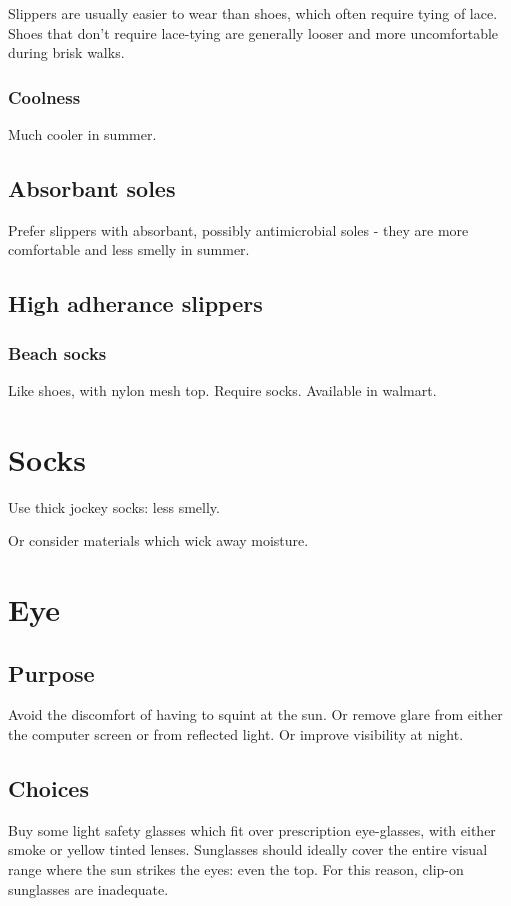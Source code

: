 \documentclass[oneside, article]{memoir}
\begin{document}
Slippers are usually easier to wear than shoes, which often require tying of lace. Shoes that don't require lace-tying are generally looser and more uncomfortable during brisk walks.

\subsubsection{Coolness}
Much cooler in summer.

\subsection{Absorbant soles}
Prefer slippers with absorbant, possibly antimicrobial soles - they are more comfortable and less smelly in summer.

\subsection{High adherance slippers}
\subsubsection{Beach socks}
Like shoes, with nylon mesh top. Require socks. Available in walmart.

\section{Socks}
Use thick jockey socks: less smelly.

Or consider materials which wick away moisture.

\section{Eye}
\subsection{Purpose}
Avoid the discomfort of having to squint at the sun. Or remove glare from either the computer screen or from reflected light. Or improve visibility at night.

\subsection{Choices}
Buy some light safety glasses which fit over prescription eye-glasses, with either smoke or yellow tinted lenses. Sunglasses should ideally cover the entire visual range where the sun strikes the eyes: even the top. For this reason, clip-on sunglasses are inadequate. 
\end{document}
